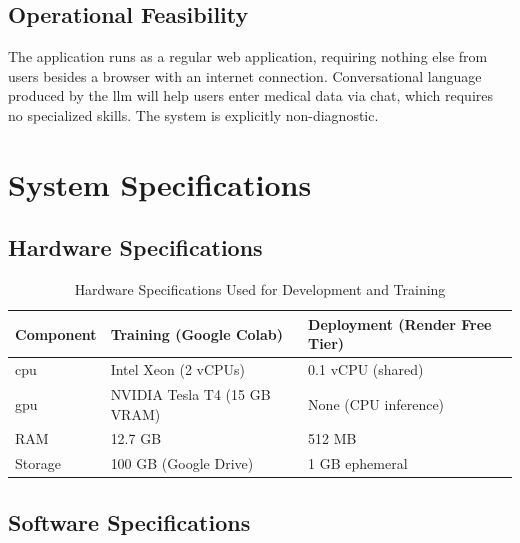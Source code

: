 \subsection{Operational Feasibility}

The application runs as a regular web application, requiring nothing else from users besides a browser with an internet connection. Conversational language produced by the \ac{llm} will help users enter medical data via chat, which requires no specialized skills. The system is explicitly non-diagnostic.

\section{System Specifications}

\subsection{Hardware Specifications}

\begin{table}[h!]
\centering
\caption{Hardware Specifications Used for Development and Training}
\renewcommand{\arraystretch}{1.3}
\begin{tabular}{|l|l|l|}
\hline
\textbf{Component} & \textbf{Training (Google Colab)} & \textbf{Deployment (Render Free Tier)} \\
\hline
\ac{cpu} & Intel Xeon (2 vCPUs) & 0.1 vCPU (shared) \\
\ac{gpu} & NVIDIA Tesla T4 (15 GB VRAM) & None (CPU inference) \\
RAM & 12.7 GB & 512 MB \\
Storage & 100 GB (Google Drive) & 1 GB ephemeral \\
\hline
\end{tabular}
\end{table}

\subsection{Software Specifications}

